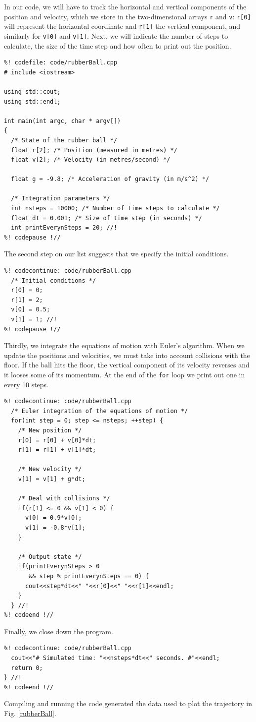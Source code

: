 In our code, we will have to track the horizontal and vertical components of the 
position and velocity, which we store in the two-dimensional arrays \texttt{r} 
and \texttt{v}: \texttt{r[0]} will represent the horizontal coordinate and 
\texttt{r[1]} the vertical component, and similarly for \texttt{v[0]} and 
\texttt{v[1]}. Next, we will indicate the number of steps to calculate, the size 
of the time step and how often to print out the position.
\begin{lstlisting}
%! codefile: code/rubberBall.cpp
# include <iostream>

using std::cout;
using std::endl;

int main(int argc, char * argv[])
{
  /* State of the rubber ball */
  float r[2]; /* Position (measured in metres) */
  float v[2]; /* Velocity (in metres/second) */

  float g = -9.8; /* Acceleration of gravity (in m/s^2) */

  /* Integration parameters */
  int nsteps = 10000; /* Number of time steps to calculate */
  float dt = 0.001; /* Size of time step (in seconds) */
  int printEverynSteps = 20; //!
%! codepause !//
\end{lstlisting}
The second step on our list suggests that we specify the initial conditions.
\begin{lstlisting}
%! codecontinue: code/rubberBall.cpp
  /* Initial conditions */
  r[0] = 0;
  r[1] = 2;
  v[0] = 0.5;
  v[1] = 1; //!
%! codepause !//
\end{lstlisting}
Thirdly, we integrate the equations of motion with Euler's algorithm. When we
update the positions and velocities, we must take into account collisions with
the floor. If the ball hits the floor, the vertical component of its velocity
reverses and it looses some of its momentum. At the end of the \texttt{for}
loop we print out one in every 10 steps.
\begin{lstlisting}
%! codecontinue: code/rubberBall.cpp
  /* Euler integration of the equations of motion */
  for(int step = 0; step <= nsteps; ++step) {
    /* New position */
    r[0] = r[0] + v[0]*dt;
    r[1] = r[1] + v[1]*dt;

    /* New velocity */
    v[1] = v[1] + g*dt;

    /* Deal with collisions */
    if(r[1] <= 0 && v[1] < 0) {
      v[0] = 0.9*v[0];
      v[1] = -0.8*v[1];
    }

    /* Output state */
    if(printEverynSteps > 0
       && step % printEverynSteps == 0) {
      cout<<step*dt<<" "<<r[0]<<" "<<r[1]<<endl;
    }
  } //!
%! codeend !//
\end{lstlisting}
Finally, we close down the program.
\begin{lstlisting}
%! codecontinue: code/rubberBall.cpp
  cout<<"# Simulated time: "<<nsteps*dt<<" seconds. #"<<endl;
  return 0;
} //!
%! codeend !//
\end{lstlisting}
Compiling and running the code generated the data used to plot the trajectory
in Fig. \ref{rubberBall}.

